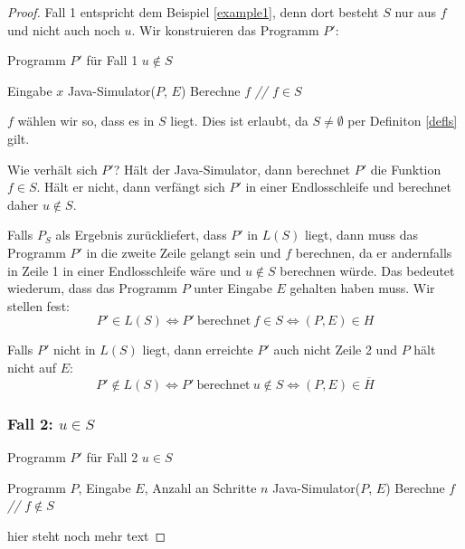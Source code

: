 \documentclass[journal]{IEEEtran}
\begin{document}
\begin{proof}
Fall 1 entspricht dem Beispiel \ref{example1}, denn dort besteht $S$ nur aus $f$ und nicht auch noch $u$. Wir konstruieren das Programm $P'$:

\begin{algorithm}
\caption{Programm $P'$ für Fall 1 $u \notin S$}
\begin{algorithmic}[1]
\renewcommand{\algorithmicrequire}{\textbf{Input:}}
\renewcommand{\algorithmicensure}{\textbf{Output:}}
\REQUIRE Eingabe $x$
\STATE Java-Simulator($P$, $E$)
\STATE Berechne $f$ \textit{// $f \in S$}
\end{algorithmic}
\end{algorithm}

$f$ wählen wir so, dass es in $S$ liegt. Dies ist erlaubt, da $S \ne \emptyset$ per Definiton \ref{defls} gilt.

Wie verhält sich $P'$? Hält der Java-Simulator, dann berechnet $P'$ die Funktion $f \in S$. Hält er nicht, dann verfängt sich $P'$ in einer Endlosschleife und berechnet daher $u \notin S$.

Falls $P_S$ als Ergebnis zurückliefert, dass $P'$ in $L(S)$ liegt, dann muss das Programm $P'$ in die zweite Zeile gelangt sein und $f$ berechnen, da er andernfalls in Zeile 1 in einer Endlosschleife wäre und $u \notin S$ berechnen würde. Das bedeutet wiederum, dass das Programm $P$ unter Eingabe $E$ gehalten haben muss. Wir stellen fest:
\begin{equation*}
P' \in L(S) \Leftrightarrow P' \ \text{berechnet} \ f \in S \Leftrightarrow (P, E) \in H
\end{equation*}

Falls $P'$ nicht in $L(S)$ liegt, dann erreichte $P'$ auch nicht Zeile 2 und $P$ hält nicht auf $E$:
\begin{equation*}
P' \notin L(S) \Leftrightarrow P' \ \text{berechnet} \ u \notin S \Leftrightarrow (P, E) \in \overline{H}
\end{equation*}

\subsubsection{Fall 2: $u \in S$}

\begin{algorithm}
\caption{Programm $P'$ für Fall 2 $u \in S$}
\begin{algorithmic}[1]
\renewcommand{\algorithmicrequire}{\textbf{Input:}}
\renewcommand{\algorithmicensure}{\textbf{Output:}}
\REQUIRE Programm $P$, Eingabe $E$, Anzahl an Schritte $n$
\STATE Java-Simulator($P$, $E$)
\STATE Berechne $f$ \textit{// $f \notin S$}
\end{algorithmic}
\end{algorithm}

hier steht noch mehr text

\end{proof}
\end{document}
